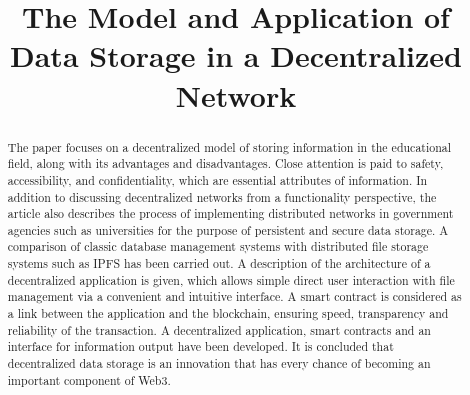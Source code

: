 \documentclass[10pt,conference,a4paper]{IEEEtran_EDM}
\def\confheader{}
\begin{document}
\markboth{\confheader}{}
\title{The Model and Application of Data Storage in a Decentralized Network}

\author{
\and
{}
\and
{}
\and
}

\maketitle


\begin{abstract}
The paper focuses on a decentralized model of storing information in the educational field, along with its advantages and disadvantages.
Close attention is paid to safety, accessibility, and confidentiality, which are essential attributes of information.
In addition to discussing decentralized networks from a functionality perspective, the article also describes the process of implementing distributed networks in government agencies such as universities for the purpose of persistent and secure data storage.
A comparison of classic database management systems with distributed file storage systems such as IPFS has been carried out.
A description of the architecture of a decentralized application is given, which allows simple direct user interaction with file management via a convenient and intuitive interface.
A smart contract is considered as a link between the application and the blockchain, ensuring speed, transparency and reliability of the transaction.
A decentralized application, smart contracts and an interface for information output have been developed.
It is concluded that decentralized data storage is an innovation that has every chance of becoming an important component of Web3.

\end{abstract}
\end{document}
